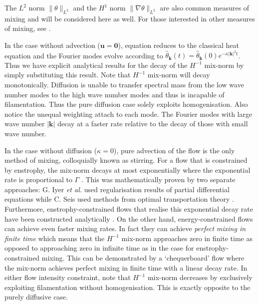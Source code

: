 \documentclass[12pt]{iopart}
\newcommand{\ltwo}[1]{\|#1\|_{L^{2}}}
\newcommand{\hone}[1]{\| \nabla #1\|_{L^{2}}}
\renewcommand{\vec}[1]{\mathbf{#1}}
\begin{document}
The $L^{2}$ norm $\ltwo{\theta}$ and the $H^{1}$ norm $\hone{\theta}$ are also common measures of mixing and will be considered here as well.  For those interested in other measures of mixing, see \cite{JLT2012}. 

In the case without advection ($\vec{u}=\vec{0}$), equation  reduces to the classical heat equation \cite{Evans2010} and the Fourier modes evolve according to $\hat{\theta}_{\vec{k}}(t)=\hat{\theta}_{\vec{k}}(0)e^{-\kappa|\vec{k}|^2t}$. Thus we have explicit analytical results for the decay of the $H^{-1}$ mix-norm by simply substituting this result. Note that $H^{-1}$ mix-norm will decay monotonically. Diffusion is unable to transfer spectral mass from the low wave number modes to the high wave number modes and thus is incapable of filamentation. Thus the pure diffusion case solely exploits homogenisation. Also notice the unequal weighting attach to each mode. The Fourier modes with large wave number $|\vec{k}|$ decay at a faster rate relative to the decay of those with small wave number.


In the case without diffusion ($\kappa = 0$), pure advection of the flow is the only method of mixing, colloquially known as stirring. For a flow that is constrained by enstrophy, the mix-norm decays at most exponentially where the exponential rate is proportional to $\Gamma$ \cite{GI2014,CS2013}. This was mathematically proven by two separate approaches: G. Iyer {\it et al.} \cite{GI2014} used regularisation results \cite{Crippa} of partial differential equations  while C. Seis \cite{CS2013} used methods from optimal transportation theory \cite{villani2003topics}. Furthermore, enstrophy-constrained flows that realise this exponential decay rate have been constructed analytically \cite{Alberti2014a}. On the other hand, energy-constrained flows can achieve even faster mixing rates. In fact they can achieve {\it perfect mixing in finite time} which means that the $H^{-1}$ mix-norm approaches zero in finite time as opposed to approaching zero in infinite time as in the case for enstrophy-constrained mixing. This can be demonstrated by a `chequerboard' flow \cite{JMP2012} where the mix-norm achieves perfect mixing in finite time with a linear decay rate.  In either flow intensity constraint, note that $H^{-1}$ mix-norm decreases by exclusively exploiting filamentation without homogenisation. This is  exactly opposite to the purely diffusive case.
\end{document}
